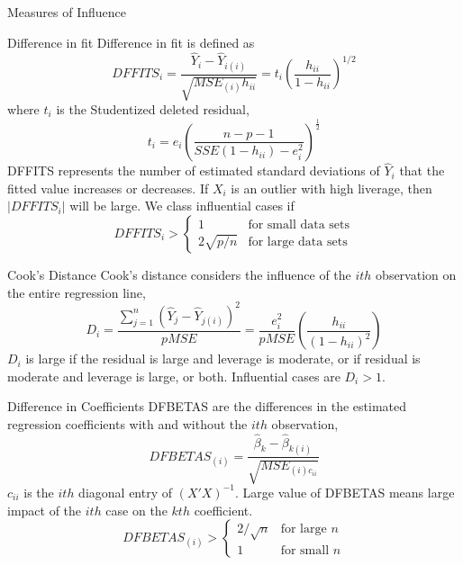\documentclass{article}
\begin{document}
\begin{multicols*}{3}
    \begin{blackbox}{Measures of Influence}
        \begin{redbox}{Difference in fit}
            Difference in fit is defined as \\[-2ex]
            \[DFFITS_i = \frac{\hat{Y}_i - \hat{Y}_{i(i)}}{\sqrt{MSE_{(i)}h_{ii}}} = t_i \left(\frac{h_{ii}}{1-h_{ii}}\right)^{1/2}\]
            where $t_i$ is the Studentized deleted residual, \\[-2ex]
            \[t_i = e_i\left(\frac{n-p-1}{SSE(1-h_{ii})-e_i^2}\right)^{\frac{1}{2}}\]
            DFFITS represents the number of estimated standard deviations of $\hat{Y}_i$ that the fitted value increases or decreases. If $X_i$ is an outlier with high liverage, then $|DFFITS_i|$ will be large. We class influential cases if\\[-4ex]
            \[DFFITS_i > \begin{cases}
                1 & \text{for small data sets}\\
                2\sqrt{p/n} & \text{for large data sets}
            \end{cases}\]            
        \end{redbox}
        \begin{bluebox}{Cook's Distance}
            Cook's distance considers the influence of the $ith$ observation on the entire regression line, \\[-2ex]
            \[D_i = \frac{\sum_{j=1}^n (\hat{Y}_j - \hat{Y}_{j(i)})^2}{pMSE} = \frac{e_i^2}{pMSE}\left(\frac{h_{ii}}{(1-h_{ii})^2}\right)\]
            $D_i$ is large if the residual is large and leverage is moderate, or if residual is moderate and leverage is large, or both. Influential cases are $D_i > 1$.
        \end{bluebox}
        \begin{brownbox}{Difference in Coefficients}
            DFBETAS are the differences in the estimated regression coefficients with and without the $ith$ observation, \\[-4ex]
            \[DFBETAS_{(i)} = \frac{\hat{\beta}_k - \hat{\beta}_{k(i)}}{\sqrt{MSE_{(i)c_{ii}}}}\]
            $c_{ii}$ is the $ith$ diagonal entry of $(X'X)^{-1}$. Large value of DFBETAS means large impact of the $ith$ case on the $kth$ coefficient. \\[-2ex]
            \[DFBETAS_{(i)} > \begin{cases}
                2/\sqrt{n} & \text{for large $n$}\\
                1 & \text{for small $n$}

\end{cases}\]
\end{brownbox}
\end{blackbox}
\end{multicols*}
\end{document}
